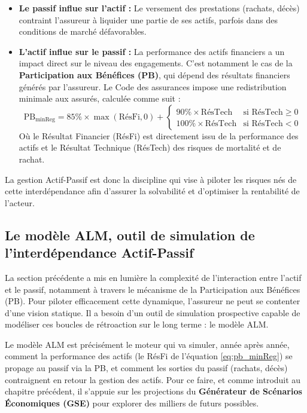 \begin{itemize}
    \item \textbf{Le passif influe sur l'actif :} Le versement des prestations (rachats, décès) contraint l'assureur à liquider une partie de ses actifs, parfois dans des conditions de marché défavorables.
        \item \textbf{L'actif influe sur le passif :} La performance des actifs financiers a un impact direct sur le niveau des engagements. C'est notamment le cas de la \textbf{Participation aux Bénéfices (PB)}, qui dépend des résultats financiers générés par l'assureur. Le Code des assurances impose une redistribution minimale aux assurés, calculée comme suit :
        \begin{equation}
            \label{eq:pb_minReg}
            \text{PB}_{\text{minReg}} = 85\% \times \max(\text{RésFi}, 0) + 
            \begin{cases}
                90\% \times \text{RésTech} & \text{si RésTech} \ge 0 \\
                100\% \times \text{RésTech} & \text{si RésTech} < 0
            \end{cases}
        \end{equation}
        Où le Résultat Financier (RésFi) est directement issu de la performance des actifs et le Résultat Technique (RésTech) des risques de mortalité et de rachat.
\end{itemize}
La gestion Actif-Passif est donc la discipline qui vise à piloter les risques nés de cette interdépendance afin d'assurer la solvabilité et d'optimiser la rentabilité de l'acteur.

\subsection{Le modèle ALM, outil de simulation de l'interdépendance Actif-Passif}
La section précédente a mis en lumière la complexité de l'interaction entre l'actif et le passif, notamment à travers le mécanisme de la Participation aux Bénéfices (PB). Pour piloter efficacement cette dynamique, l'assureur ne peut se contenter d'une vision statique. Il a besoin d'un outil de simulation prospective capable de modéliser ces boucles de rétroaction sur le long terme : le modèle ALM.

Le modèle ALM est précisément le moteur qui va simuler, année après année, comment la performance des actifs (le RésFi de l'équation \ref{eq:pb_minReg}) se propage au passif via la PB, et comment les sorties du passif (rachats, décès) contraignent en retour la gestion des actifs. Pour ce faire, et comme introduit au chapitre précédent, il s'appuie sur les projections du \textbf{Générateur de Scénarios Économiques (GSE)} pour explorer des milliers de futurs possibles.

